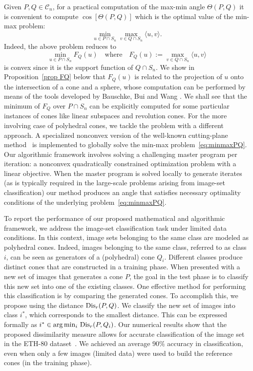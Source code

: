 \documentclass[hidelinks,onefignum,onetabnum]{siamart250211}
\theoremstyle{definition}
\theoremstyle{remark}
\newcommand{\CC}{\mathcal C}
\newcommand{\Sim}{{\rm Dis}}
\begin{document}
Given $P,Q \in \CC_n$, for a practical computation of the max-min angle $\Theta(P,Q)$ it is convenient to compute $\cos[\Theta(P,Q)]$ which is the optimal value of the min-max problem:
\begin{equation}\label{eq:minmaxPQ}
\min_{u\in P\cap S_n}\max_{v\in Q\cap S_n}\langle u,v\rangle.
\end{equation}
Indeed, the above problem reduces to 
\[\min_{u\in P\cap S_n}F_Q(u) \quad \mbox{where} \quad F_Q(u):=\max_{v\in Q\cap S_n}\langle u, v\rangle
\]
is convex since it is the support function of $Q\cap S_n$. We show in Proposition~\ref{prop FQ} below that $F_Q(u)$ is related to the projection of $u$ onto the intersection of a cone and a sphere, whose computation can be performed by means of the tools developed by Bauschke, Bui and Wang \cite{Bauschke}. 
We shall see that the minimum of $F_Q$ over $P\cap S_n$ can be explicitly computed for some particular instances of cones like linear subspaces and revolution cones. For the more involving case of polyhedral cones, we tackle the problem with a different approach. A specialized nonconvex version of the well-known cutting-plane method~\cite{Kelley_1960} is implemented to globally solve the min-max problem~\eqref{eq:minmaxPQ}.
Our algorithmic framework
involves solving a challenging
master program per iteration: a nonconvex quadratically constrained optimization problem with a linear objective. When the master program is solved locally to generate iterates (as is typically required in the large-scale problems arising from image-set classification) our method produces an angle that satisfies necessary optimality conditions of the underlying problem~\eqref{eq:minmaxPQ}.



To report the performance of our proposed mathematical and algorithmic framework, we address the
image-set classification task under limited data conditions. In this context, image sets belonging to the same class are modeled as
polyhedral cones. Indeed, images belonging to the same class, referred to as class $i$, can be seen as generators of a (polyhedral) cone $Q_i$. Different classes produce distinct cones that are constructed in a training phase. When presented with a new set of images that generates a cone \( P \), the goal in the test phase is to classify this new set into one of the existing classes.
%
One effective method for performing this classification is by comparing the generated cones. To accomplish this, we propose using the distance $\Sim_r(P,Q)$. We classify the new set of images into class $ i^*$, which corresponds to the smallest distance. This can be expressed formally as $ i^* \in \arg\min_{i}\, \Sim_r(P, Q_i)$. 
Our numerical results show that the proposed dissimilarity measure allows for accurate classification of the image set in the ETH-80 dataset~\cite{Chen2020}. We achieved an average $90 \%$ accuracy in classification, even when only a few images (limited data) were used to build the reference cones (in the training phase).
\end{document}
